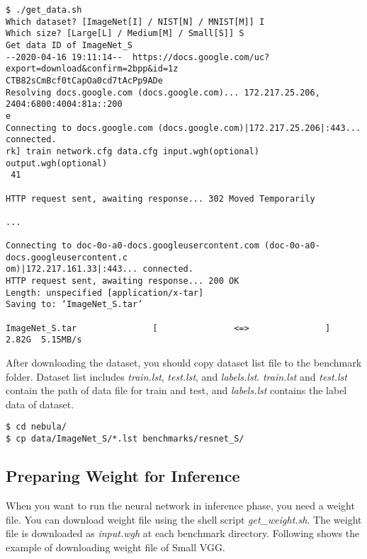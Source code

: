 \documentclass[10pt]{article}
\begin{document}
\begin{Verbatim}[frame=single,fontsize=\small]
$ ./get_data.sh
Which dataset? [ImageNet[I] / NIST[N] / MNIST[M]] I
Which size? [Large[L] / Medium[M] / Small[S]] S
Get data ID of ImageNet_S
--2020-04-16 19:11:14--  https://docs.google.com/uc?export=download&confirm=2bpp&id=1z
CTB82sCmBcf0tCapOa0cd7tAcPp9ADe
Resolving docs.google.com (docs.google.com)... 172.217.25.206, 2404:6800:4004:81a::200
e
Connecting to docs.google.com (docs.google.com)|172.217.25.206|:443... connected.
rk] train network.cfg data.cfg input.wgh(optional) output.wgh(optional)
 41 

HTTP request sent, awaiting response... 302 Moved Temporarily

...

Connecting to doc-0o-a0-docs.googleusercontent.com (doc-0o-a0-docs.googleusercontent.c
om)|172.217.161.33|:443... connected.
HTTP request sent, awaiting response... 200 OK
Length: unspecified [application/x-tar]
Saving to: ‘ImageNet_S.tar’

ImageNet_S.tar               [               <=>               ]   2.82G  5.15MB/s  

\end{Verbatim}

After downloading the dataset, you should copy dataset list file to the benchmark folder.
Dataset list includes \emph{train.lst}, \emph{test.lst}, and \emph{labels.lst}.
\emph{train.lst} and \emph{test.lst} contain the path of data file for train and test, and \emph{labels.lst} contains the label data of dataset.

\begin{Verbatim}[frame=single,fontsize=\small]
$ cd nebula/
$ cp data/ImageNet_S/*.lst benchmarks/resnet_S/
\end{Verbatim}

\subsection{Preparing Weight for Inference} \label{subsec:weight}
When you want to run the neural network in inference phase, you need a weight file.
You can download weight file using the shell script \emph{get\_weight.sh}.
The weight file is downloaded as \emph{input.wgh} at each benchmark directory.
Following shows the example of downloading weight file of Small VGG.
\end{document}
